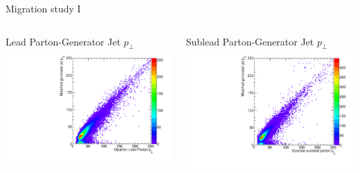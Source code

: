 \documentclass[8pt]{beamer}
\begin{document}
\begin{frame}{Migration study I}

\vspace{-17px}

\begin{columns}

  \centering

  \begin{block}{Lead Parton-Generator Jet $p_\perp$}
    \centering
    \includegraphics[width=0.8\linewidth]{img/migrations/SelDiParton_MatchedGenJet_Parton1_Pt.pdf}
    
  \end{block}
  
  \centering
 
  \begin{block}{Sublead Parton-Generator Jet $p_\perp$}
    \centering
    \includegraphics[width=0.8\linewidth]{img/migrations/SelDiParton_MatchedGenJet_Parton2_Pt.pdf}
  \end{block}


\end{columns}
\end{frame}
\end{document}
